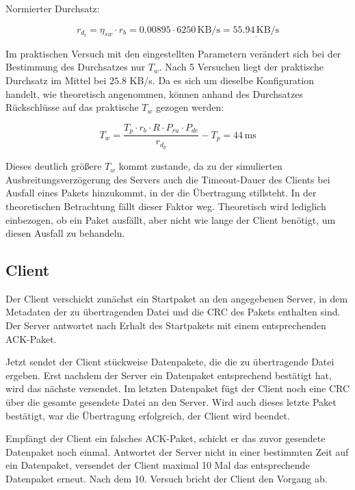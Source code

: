 \documentclass{article}
\begin{document}
			Normierter Durchsatz:

			\begin{equation*}
				r_{d_t} = \eta_{sw} \cdot r_b = 0.00895 \cdot 6250 \,\text{KB/s} = \underline{55.94 \,\text{KB/s}}
			\end{equation*}
			\newline

			Im praktischen Versuch mit den eingestellten Parametern verändert sich bei der Bestimmung des Durchsatzes nur $T_w$. Nach 5 Versuchen liegt der praktische Durchsatz im Mittel bei $25.8$ KB/s. Da es sich um dieselbe Konfiguration handelt, wie theoretisch angenommen, können anhand des Durchsatzes Rückschlüsse auf das praktische $T_w$ gezogen werden:

			\begin{equation*}
				T_w = \frac{T_p \cdot r_b \cdot R \cdot P_{r\ddot{u}} \cdot P_{de}}{r_{d_p}} - T_p = 44 \,\text{ms}
			\end{equation*}
			\newline

			Dieses deutlich größere $T_w$ kommt zustande, da zu der simulierten Ausbreitungsverzögerung des Servers auch die Timeout-Dauer des Clients bei Ausfall eines Pakets hinzukommt, in der die Übertragung stillsteht. In der theoretischen Betrachtung fällt dieser Faktor weg. Theoretisch wird lediglich einbezogen, ob ein Paket ausfällt, aber nicht wie lange der Client benötigt, um diesen Ausfall zu behandeln.


		\subsection{Client}
		
		Der Client verschickt zunächst ein Startpaket an den angegebenen Server, in dem Metadaten der zu übertragenden Datei und die CRC des Pakets enthalten sind. Der Server antwortet nach Erhalt des Startpakets mit einem entsprechenden ACK-Paket.

		Jetzt sendet der Client stückweise Datenpakete, die die zu übertragende Datei ergeben. Erst nachdem der Server ein Datenpaket entsprechend bestätigt hat, wird das nächste versendet. Im letzten Datenpaket fügt der Client noch eine CRC über die gesamte gesendete Datei an den Server. Wird auch dieses letzte Paket bestätigt, war die Übertragung erfolgreich, der Client wird beendet.

		Empfängt der Client ein falsches ACK-Paket, schickt er das zuvor gesendete Datenpaket noch einmal. Antwortet der Server nicht in einer bestimmten Zeit auf ein Datenpaket, versendet der Client maximal 10 Mal das entsprechende Datenpaket erneut. Nach dem 10. Versuch bricht der Client den Vorgang ab.
\end{document}
